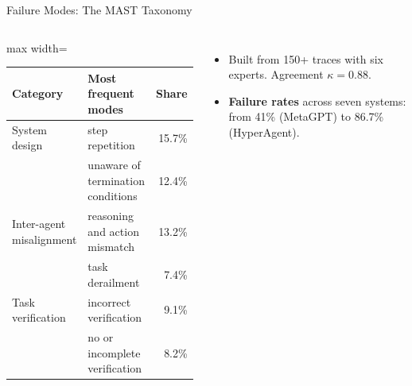 \begin{frame}{Failure Modes: The MAST Taxonomy}
    \begin{columns}[T,onlytextwidth]
        \centering
        \small
        \renewcommand{\arraystretch}{1.15}
        \begin{adjustbox}{max width=\linewidth}\begin{tabular}{>{\raggedright\arraybackslash}p{2.6cm}>{\raggedright\arraybackslash}p{4.1cm}r}
            \toprule
            \textbf{Category} & \textbf{Most frequent modes} & \textbf{Share} \\
            \midrule
            System design & step repetition & 15.7\% \\
            & unaware of termination conditions & 12.4\% \\
            \midrule
            Inter-agent misalignment & reasoning and action mismatch & 13.2\% \\
            & task derailment & 7.4\% \\
            \midrule
            Task verification & incorrect verification & 9.1\% \\
            & no or incomplete verification & 8.2\% \\
            \bottomrule
        \end{tabular}\end{adjustbox}
        \begin{itemize}\itemsep0.45em
            \item Built from 150+ traces with six experts. Agreement $\kappa = 0.88$.
            \item \textbf{Failure rates} across seven systems: from 41\% (MetaGPT) to 86.7\% (HyperAgent).
        \end{itemize}
    \end{columns}
    \vspace{0.4em}
\end{frame}

